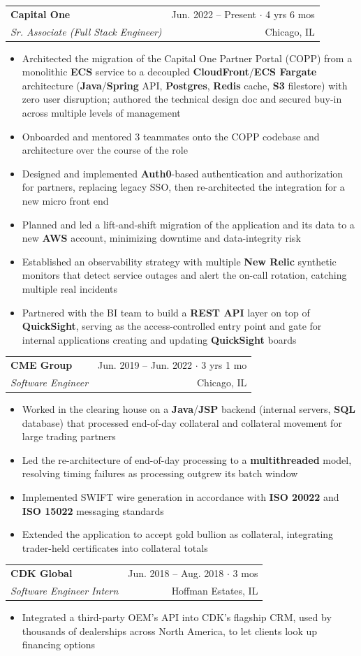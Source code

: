 \documentclass[letterpaper,11pt]{article}
\makeatletter
\newcommand{\resumeItem}[1]{
    \item\small{
            {#1 \vspace{-1pt}}
    }
}
\newcommand{\resumeSubheading}[4]{
    \vspace{-1pt}\item
    \begin{tabular*}{\textwidth}[t]{l@{\extracolsep{\fill}}r}
        \textbf{#1} & {\color{dark-grey}\small #2}\vspace{1pt}\\ %
        \textit{#3} & {\color{dark-grey} \small #4}\\ %
    \end{tabular*}\vspace{-4pt}
}
\newcommand{\resumeItemListStart}{\begin{itemize}}
\newcommand{\resumeItemListEnd}{\end{itemize}\vspace{0pt}}
\makeatother
\begin{document}
\resumeSubheading
{Capital One}{Jun. 2022 -- Present $\cdot$ 4 yrs 6 mos}
{Sr. Associate (Full Stack Engineer)}{Chicago, IL}
\resumeItemListStart
\resumeItem{Architected the migration of the Capital One Partner Portal (COPP) from a monolithic \textbf{ECS} service to a decoupled \textbf{CloudFront}/\textbf{ECS Fargate} architecture (\textbf{Java}/\textbf{Spring} API, \textbf{Postgres}, \textbf{Redis} cache, \textbf{S3} filestore) with zero user disruption; authored the technical design doc and secured buy-in across multiple levels of management}
\resumeItem{Onboarded and mentored 3 teammates onto the COPP codebase and architecture over the course of the role}
\resumeItem{Designed and implemented \textbf{Auth0}-based authentication and authorization for partners, replacing legacy SSO, then re-architected the integration for a new micro front end}
\resumeItem{Planned and led a lift-and-shift migration of the application and its data to a new \textbf{AWS} account, minimizing downtime and data-integrity risk}
\resumeItem{Established an observability strategy with multiple \textbf{New Relic} synthetic monitors that detect service outages and alert the on-call rotation, catching multiple real incidents}
\resumeItem{Partnered with the BI team to build a \textbf{REST API} layer on top of \textbf{QuickSight}, serving as the access-controlled entry point and gate for internal applications creating and updating \textbf{QuickSight} boards}
\resumeItemListEnd

\resumeSubheading
{CME Group}{Jun. 2019 -- Jun. 2022 $\cdot$ 3 yrs 1 mo}
{Software Engineer}{Chicago, IL}
\resumeItemListStart
\resumeItem{Worked in the clearing house on a \textbf{Java}/\textbf{JSP} backend (internal servers, \textbf{SQL} database) that processed end-of-day collateral and collateral movement for large trading partners}
\resumeItem{Led the re-architecture of end-of-day processing to a \textbf{multithreaded} model, resolving timing failures as processing outgrew its batch window}
\resumeItem{Implemented SWIFT wire generation in accordance with \textbf{ISO 20022} and \textbf{ISO 15022} messaging standards}
\resumeItem{Extended the application to accept gold bullion as collateral, integrating trader-held certificates into collateral totals}
\resumeItemListEnd

\resumeSubheading
{CDK Global}{Jun. 2018 -- Aug. 2018 $\cdot$ 3 mos}
{Software Engineer Intern}{Hoffman Estates, IL}
\resumeItemListStart
\resumeItem{Integrated a third-party OEM's API into CDK's flagship CRM, used by thousands of dealerships across North America, to let clients look up financing options}
\resumeItemListEnd
\end{document}
